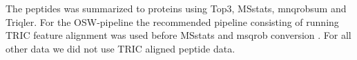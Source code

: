\documentclass[10pt,letterpaper]{article}
\begin{document}
The peptides was summarized to proteins using Top3, MSstats, mnqrobsum and Triqler. For the OSW-pipeline the recommended pipeline consisting of running TRIC feature alignment was used before MSstats and msqrob conversion . For all other data we did not use TRIC aligned peptide data. 

\end{document}
